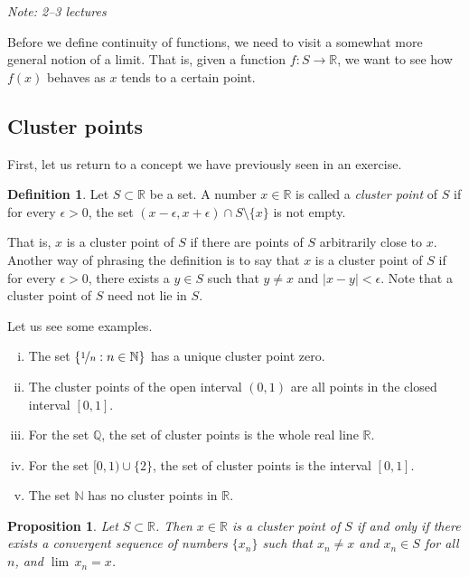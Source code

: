 \documentclass[12pt]{book}
\newcommand{\abs}[1]{\left\lvert {#1} \right\rvert}
\newcommand{\R}{{\mathbb{R}}}
\newcommand{\N}{{\mathbb{N}}}
\newcommand{\Q}{{\mathbb{Q}}}
\newcommand{\myindex}[1]{#1\index{#1}}
\newcommand{\sectionnotes}[1]{\noindent \emph{Note: #1} \medskip \par}
\theoremstyle{plain}
\newtheorem{prop}[thm]{Proposition}
\theoremstyle{remark}
\theoremstyle{definition}
\newtheorem{defn}[thm]{Definition}
\theoremstyle{exercise}
\theoremstyle{example}
\begin{document}
\sectionnotes{2--3 lectures}

Before we define continuity of functions, we need to visit a somewhat
more general notion of a limit.  That is, given a function $f \colon S \to
\R$, we want to see how $f(x)$ behaves as $x$ tends to a certain point.

\subsection{Cluster points}

First,
let us return to a concept we have previously seen in an exercise.

\begin{defn}
Let $S \subset \R$ be a set.  A number $x \in \R$ is called
a \emph{\myindex{cluster point}} of $S$
if for every $\epsilon > 0$, the set $(x-\epsilon,x+\epsilon) \cap S
\setminus \{ x \}$ is not empty.
\end{defn}

That is, $x$ is a cluster point of $S$ if there are points of $S$
arbitrarily close to $x$.  Another way of phrasing the definition is to say
that $x$ is a cluster point of $S$ if for every $\epsilon > 0$, there
exists a $y \in S$ such that $y \not= x$ and $\abs{x - y} < \epsilon$.
Note that a cluster point of $S$ need not lie in $S$.

Let us see some examples.
\begin{enumerate}[(i)]
\item The set
$\{ \nicefrac{1}{n} : n \in \N \}$ has a unique cluster point zero.
\item The cluster points of the open interval $(0,1)$ are
all points in the closed interval $[0,1]$.
\item For the set $\Q$, the set of
cluster points is the whole real line $\R$.
\item For the set $[0,1) \cup \{ 2 \}$,
the set of cluster points is the interval $[0,1]$.
\item The set $\N$ has no cluster points in $\R$.
\end{enumerate}

\begin{prop}
Let $S \subset \R$.  Then $x \in \R$ is a cluster point of $S$
if and only if
there exists a convergent sequence of numbers $\{ x_n \}$ such that
$x_n \not= x$ and $x_n \in S$ for all $n$, and $\lim\, x_n = x$.
\end{prop}
\end{document}
